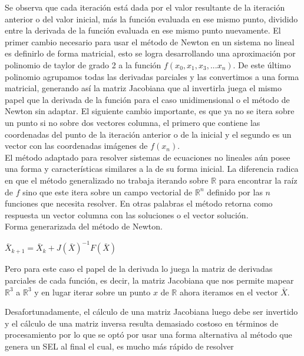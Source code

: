﻿\documentclass[11pt]{article}
\begin{document}
Se observa que cada iteración está dada por el valor resultante de la iteración anterior o del valor inicial, más la función evaluada en ese mismo punto, dividido entre la derivada de la función evaluada en ese mismo punto nuevamente. El primer cambio necesario para usar el método de Newton en un sistema no lineal es definirlo de forma matricial, esto se logra desarrollando una aproximación por polinomio de taylor de grado 2 a la función $f(x_{0},x_{1},x_{3},...x_{n})$. De este último polinomio agrupamos todas las derivadas parciales y las convertimos a una forma matricial, generando así la matriz Jacobiana que al invertirla juega el mismo papel que la derivada de la función para el caso unidimensional o el método de Newton sin adaptar. El siguiente cambio importante, es que ya no se itera sobre un punto si no sobre dos vectores columna, el primero que contiene las coordenadas del punto de la iteración anterior o de la inicial y el segundo es un vector con las coordenadas imágenes de $f(x_{n})$.\\
El método adaptado para resolver sistemas de ecuaciones no lineales aún posee una forma y características similares a la de su forma inicial. La diferencia radica en que el método generalizado no trabaja iterando sobre $\mathbb{R}$ para encontrar la raíz de $f$ sino que este itera sobre un campo vectorial de $\mathbb{R}^n$ definido por las $n$ funciones que necesita resolver. En otras palabras el método retorna como respuesta un vector columna con las soluciones o el vector solución.\\

Forma generarizada del método de Newton.
 
\begin{center}
$\bar{X}_{k+1} = \bar{X}_{k} + {J(\bar{X})}^{-1}F(\bar{X})  \label{eq:2}$
\end{center}

Pero para este caso el papel de la derivada lo juega la matriz de derivadas parciales de cada función, es decir, la matriz Jacobiana que nos permite mapear  $\mathbb{R}^3$ a $\mathbb{R}^3$ y en lugar iterar sobre un punto $x$ de $\mathbb{R}$  ahora iteramos en el vector $\bar{X}$. 

Desafortunadamente, el cálculo de una matriz Jacobiana luego debe ser invertido y el cálculo de una matriz inversa resulta demasiado costoso en términos de procesamiento por lo que se optó por usar una forma alternativa al método que genera un SEL al final el cual, es mucho más rápido de resolver\\
\end{document}
